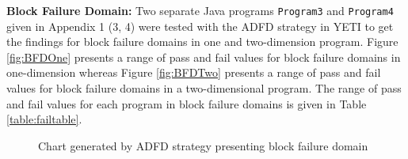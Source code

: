 
\newpage
\noindent \textbf{Block Failure Domain:}  Two separate Java programs \verb+Program3+ and \verb+Program4+ given in Appendix 1 (3, 4) were tested with the ADFD strategy in YETI to get the findings for block failure domains in one and two-dimension program. Figure \ref{fig:BFDOne} presents a range of pass and fail values for block failure domains in one-dimension whereas Figure \ref{fig:BFDTwo} presents a range of pass and fail values for block failure domains in a two-dimensional program. The range of pass and fail values for each program in block failure domains is given in Table \ref{table:failtable}.





\begin{figure} [H]
\centering
{}
\bigskip

\bigskip
\caption{Chart generated by ADFD strategy presenting block failure domain}
\end{figure}


